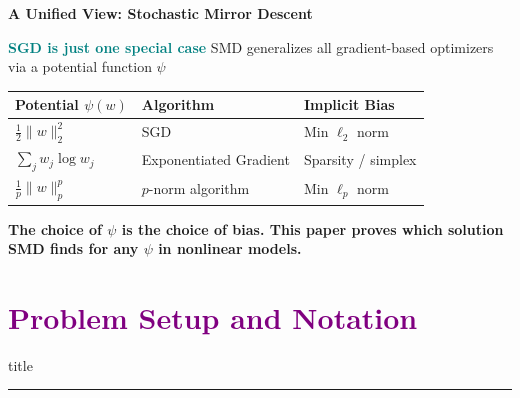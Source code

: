 \documentclass[aspectratio=169]{beamer}
\begin{document}
\begin{frame}{\textcolor{cmindsblue}{\textbf{A Unified View: Stochastic Mirror Descent}}}
    \vspace{-0.3cm}
    \begin{block}{\textbf{\textcolor{teal}{SGD is just one special case}}}
        SMD generalizes all gradient-based optimizers via a potential function $\psi$
    \end{block}
    
    \vspace{0.2cm}
    \begin{table}
    \centering
    \small
    \begin{tabular}{lll}
    \hline
    \textbf{Potential $\psi(w)$} & \textbf{Algorithm} & \textbf{Implicit Bias} \\
    \hline
    $\frac{1}{2}\|w\|_2^2$ & SGD & Min $\ell_2$ norm \\
    $\sum_j w_j \log w_j$ & Exponentiated Gradient & Sparsity / simplex \\
    $\frac{1}{p}\|w\|_p^p$ & $p$-norm algorithm & Min $\ell_p$ norm \\
    \hline
    \end{tabular}
    \end{table}
    
    \vspace{0.2cm}
    \textbf{The choice of $\psi$ is the choice of bias. This paper proves which solution SMD finds for any $\psi$ in nonlinear models.}
\end{frame}

\section{\textbf{\textcolor{purple}{Problem Setup and Notation}}}
\begin{frame}[plain]
    \vfill
    \centering
    \begin{beamercolorbox}[sep=8pt,center,shadow=true,rounded=true]{title}
        \insertsectionhead\par%
        \color{oxfordblue}\noindent\rule{10cm}{1pt}
    \end{beamercolorbox}
    \vfill
\end{frame}
\end{document}
